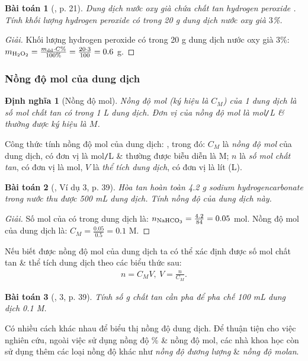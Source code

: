 \documentclass{article}
\newtheorem{baitoan}{Bài toán}
\newtheorem{dinhnghia}{Định nghĩa}
\begin{document}
\begin{baitoan}[\cite{SGK_KHTN_8_KNTTVCS}, p. 21]
	Dung dịch nước oxy già chứa chất tan hydrogen peroxide \emph{}. Tính khối lượng hydrogen peroxide có trong \emph{20 g} dung dịch nước oxy già $3$\%.
\end{baitoan}

\begin{proof}[Giải]
	Khối lượng hydrogen peroxide có trong 20 g dung dịch nước oxy già 3\%: $m_{\ce{H2O2}} = \frac{m_{\rm dd}\cdot C\%}{100\%} = \frac{20\cdot3}{100} = 0.6$ g.
\end{proof}

\subsubsection{Nồng độ mol của dung dịch}

\begin{dinhnghia}[Nồng độ mol]
	\emph{Nồng độ mol} (ký hiệu là $C_M$) của 1 dung dịch là số mol chất tan có trong \emph{1 L} dung dịch. Đơn vị của nồng độ mol là \emph{mol\texttt{/}L} \& thường được ký hiệu là $M$.
\end{dinhnghia}
Công thức tính nồng độ mol của dung dịch: , trong đó: $C_M$ là \textit{nồng độ mol} của dung dịch, có đơn vị là mol\texttt{/}L \& thường được biễu diễn là M; $n$ là \textit{số mol chất tan}, có đơn vị là mol, $V$ là \textit{thể tích dung dịch}, có đơn vị là lít (L).

\begin{baitoan}[\cite{SGK_KHTN_8_Canh_Dieu}, Ví dụ 3, p. 39]
	Hòa tan hoàn toàn \emph{4.2 g} sodium hydrogencarbonate \emph{} trong nước thu được \emph{500 mL} dung dịch. Tính nồng độ của dung dịch này.
\end{baitoan}

\begin{proof}[Giải]
	Số mol của  có trong dung dịch là: $n_{\rm NaHCO_3} = \frac{4.2}{84} = 0.05$ mol. Nồng độ mol của dung dịch  là: $C_M = \frac{0.05}{0.5} = 0.1$ M.
\end{proof}
Nếu biết được nồng độ mol của dung dịch ta có thể xác định được số mol chất tan \& thể tích dung dịch theo các biểu thức sau:
\begin{align*}
	\boxed{n = C_MV,\ V = \frac{n}{C_M}.}
\end{align*}

\begin{baitoan}[\cite{SGK_KHTN_8_Canh_Dieu}, 3, p. 39]
	Tính số \emph{g} chất tan cần pha để pha chế \emph{100 mL} dung dịch \emph{ 0.1 M}.
\end{baitoan}
Có nhiều cách khác nhau để biểu thị nồng độ dung dịch. Để thuận tiện cho việc nghiên cứu, ngoài việc sử dụng nồng độ \% \& nồng độ mol, các nhà khoa học còn sử dụng thêm các loại nồng độ khác như \textit{nồng độ đương lượng} \& \textit{nồng độ molan}.
\end{document}

